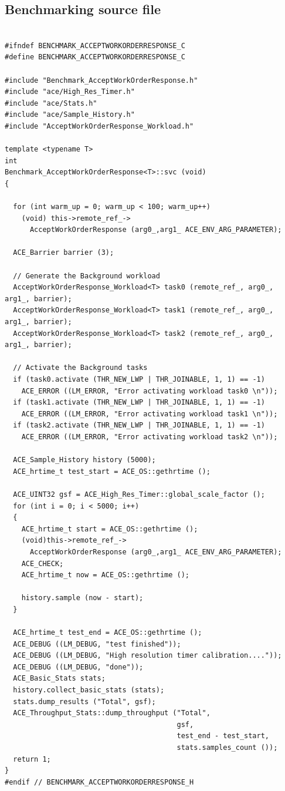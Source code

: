 \documentclass[onecolumn]{article}
\begin{document}
\subsection* {Benchmarking source file}

{
\footnotesize
\begin{verbatim}

#ifndef BENCHMARK_ACCEPTWORKORDERRESPONSE_C
#define BENCHMARK_ACCEPTWORKORDERRESPONSE_C

#include "Benchmark_AcceptWorkOrderResponse.h"
#include "ace/High_Res_Timer.h"
#include "ace/Stats.h"
#include "ace/Sample_History.h"
#include "AcceptWorkOrderResponse_Workload.h"

template <typename T>
int
Benchmark_AcceptWorkOrderResponse<T>::svc (void)
{

  for (int warm_up = 0; warm_up < 100; warm_up++)
    (void) this->remote_ref_->
      AcceptWorkOrderResponse (arg0_,arg1_ ACE_ENV_ARG_PARAMETER);

  ACE_Barrier barrier (3);

  // Generate the Background workload
  AcceptWorkOrderResponse_Workload<T> task0 (remote_ref_, arg0_, arg1_, barrier);
  AcceptWorkOrderResponse_Workload<T> task1 (remote_ref_, arg0_, arg1_, barrier);
  AcceptWorkOrderResponse_Workload<T> task2 (remote_ref_, arg0_, arg1_, barrier);

  // Activate the Background tasks
  if (task0.activate (THR_NEW_LWP | THR_JOINABLE, 1, 1) == -1)
    ACE_ERROR ((LM_ERROR, "Error activating workload task0 \n"));
  if (task1.activate (THR_NEW_LWP | THR_JOINABLE, 1, 1) == -1)
    ACE_ERROR ((LM_ERROR, "Error activating workload task1 \n"));
  if (task2.activate (THR_NEW_LWP | THR_JOINABLE, 1, 1) == -1)
    ACE_ERROR ((LM_ERROR, "Error activating workload task2 \n"));

  ACE_Sample_History history (5000);
  ACE_hrtime_t test_start = ACE_OS::gethrtime ();

  ACE_UINT32 gsf = ACE_High_Res_Timer::global_scale_factor ();
  for (int i = 0; i < 5000; i++)
  {
    ACE_hrtime_t start = ACE_OS::gethrtime ();
    (void)this->remote_ref_->
      AcceptWorkOrderResponse (arg0_,arg1_ ACE_ENV_ARG_PARAMETER);
    ACE_CHECK;
    ACE_hrtime_t now = ACE_OS::gethrtime ();

    history.sample (now - start);
  }

  ACE_hrtime_t test_end = ACE_OS::gethrtime ();
  ACE_DEBUG ((LM_DEBUG, "test finished"));
  ACE_DEBUG ((LM_DEBUG, "High resolution timer calibration...."));
  ACE_DEBUG ((LM_DEBUG, "done"));
  ACE_Basic_Stats stats;
  history.collect_basic_stats (stats);
  stats.dump_results ("Total", gsf);
  ACE_Throughput_Stats::dump_throughput ("Total",
                                         gsf,
                                         test_end - test_start,
                                         stats.samples_count ());
  return 1;
}
#endif // BENCHMARK_ACCEPTWORKORDERRESPONSE_H

\end{verbatim}
}
\end{document}
